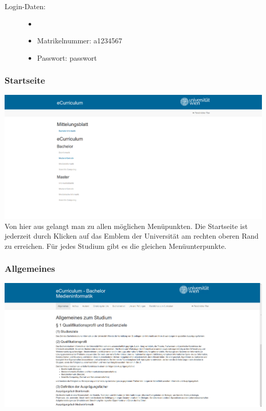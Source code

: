 \documentclass[a4paper,10pt]{scrartcl}
\begin{document}
\begin{description}
 \item[Login-Daten:] 
 \begin{itemize}
  \item[]
  \item Matrikelnummer: a1234567
  \item Passwort: passwort
 \end{itemize}

\end{description}

\subsubsection*{Startseite}

\includegraphics[scale=0.19]{./hifi_screenshots/hifi_startseite.png}\\

Von hier aus gelangt man zu allen möglichen Menüpunkten. Die Startseite ist jederzeit durch Klicken auf das Emblem der Universität am rechten oberen Rand zu erreichen. Für jedes Studium gibt es die gleichen Menüunterpunkte.

\subsubsection*{Allgemeines}

\includegraphics[scale=0.19]{./hifi_screenshots/hifi_allgemeines.png}\\
\end{document}
